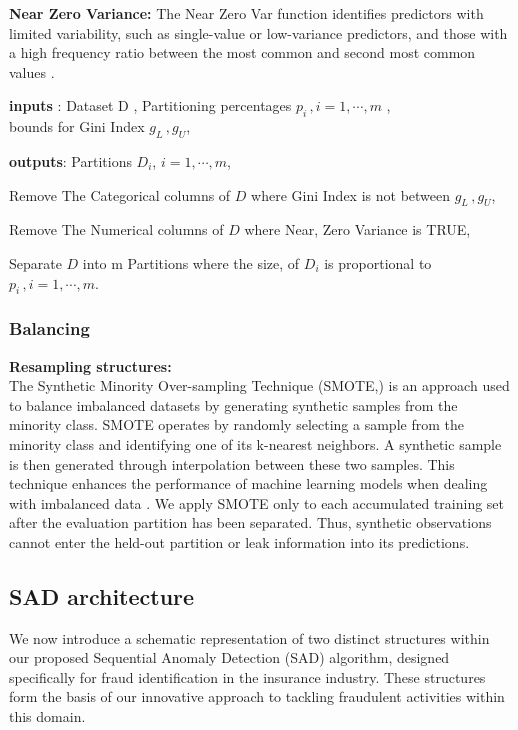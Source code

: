 \documentclass[12pt]{article}
\newenvironment{algorithmic}{%
  \begin{list}{}{\setlength{\leftmargin}{0pt}\setlength{\itemsep}{1pt}}\item[]%
}{\end{list}}
\newcommand{\STATE}{\par\noindent}
\begin{document}
\textbf{Near Zero Variance:} The Near Zero Var function identifies
predictors with limited variability, such as single-value or
low-variance predictors, and those with a high frequency ratio
between the most common and second most common values \cite{A59}.
        \begin{algorithm}[H]
            \footnotesize
            \caption{PreProcessing Algorithm}\label{algo:preprocessing}
            \begin{algorithmic}
                \STATE \textbf{inputs} :  Dataset D ,   Partitioning percentages $p_i \,, i = 1, \cdots , m$ ,\\ bounds for Gini Index $g_{L} \, , g_{U}$,
                \STATE \textbf{outputs}: Partitions $D_i$, $ i = 1, \cdots , m$,
                \STATE Remove The Categorical columns of $D$ where Gini Index is not between $g_{L} \, , g_{U}$,
                \STATE Remove The Numerical columns of $D$ where Near, Zero Variance is TRUE,
                \STATE Separate  $D$ into m Partitions where the size, of $D_i$ is proportional to $p_i \,, i = 1, \cdots , m$.
            \end{algorithmic}
        \end{algorithm}

\subsubsection*{Balancing}
        \textbf{\small Resampling structures:}\\
The Synthetic Minority Over-sampling Technique (SMOTE,) is an
approach used to balance imbalanced datasets by generating
synthetic samples from the minority class. SMOTE operates by
randomly selecting a sample from the minority class and
identifying one of its k-nearest neighbors. A synthetic sample is
then generated through interpolation between these two samples.
This technique enhances the performance of machine learning models
when dealing with imbalanced data \cite{A62}.
We apply SMOTE only to each accumulated training set after the evaluation
partition has been separated. Thus, synthetic observations cannot enter the
held-out partition or leak information into its predictions.

\subsection{SAD architecture}
We now introduce a schematic representation of two distinct
structures within our proposed Sequential Anomaly Detection (SAD)
algorithm, designed specifically for fraud identification in the
insurance industry. These structures form the basis of our
innovative approach to tackling fraudulent activities within this
domain.
\end{document}

